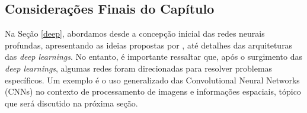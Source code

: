 \subsection{Considerações Finais do Capítulo}
\label{deep:conclusion}

Na Seção \ref{deep}, abordamos desde a concepção inicial das redes neurais profundas, apresentando as ideias propostas por \cite{mcculloch1943logical}, até detalhes das arquiteturas das \textit{deep learnings}. No entanto, é importante ressaltar que, após o surgimento das \textit{deep learnings}, algumas redes foram direcionadas para resolver problemas específicos. Um exemplo é o uso generalizado das Convolutional Neural Networks (CNNs) no contexto de processamento de imagens e informações espaciais, tópico que será discutido na próxima seção.